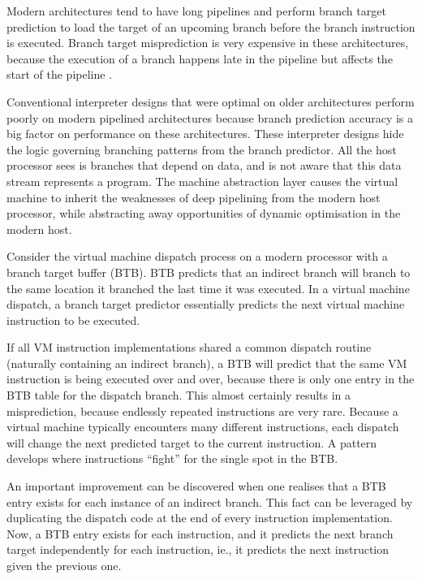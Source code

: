 		Modern architectures tend to have long pipelines and perform branch target prediction to load the target of an upcoming branch before the branch instruction is executed. Branch target misprediction is very expensive in these architectures, because the execution of a branch happens late in the pipeline but affects the start of the pipeline \citep{optimizingindirectbranch}.
				
		Conventional interpreter designs that were optimal on older architectures perform poorly on modern pipelined architectures because branch prediction accuracy is a big factor on performance on these architectures. These interpreter designs hide the logic governing branching patterns from the branch predictor. All the host processor sees is branches that depend on data, and is not aware that this data stream represents a program. The machine abstraction layer causes the virtual machine to inherit the weaknesses of deep pipelining from the modern host processor, while abstracting away opportunities of dynamic optimisation in the modern host.
		
		Consider the virtual machine dispatch process on a modern processor with a branch target buffer (BTB). BTB predicts that an indirect branch will branch to the same location it branched the last time it was executed. In a virtual machine dispatch, a branch target predictor essentially predicts the next virtual machine instruction to be executed.
		
		If all VM instruction implementations shared a common dispatch routine (naturally containing an indirect branch), a BTB will predict that the same VM instruction is being executed over and over, because there is only one entry in the BTB table for the dispatch branch. This almost certainly results in a misprediction, because endlessly repeated instructions are very rare. Because a virtual machine typically encounters many different instructions, each dispatch will change the next predicted target to the current instruction. A pattern develops where instructions ``fight'' for the single spot in the BTB.
		
		An important improvement can be discovered when one realises that a BTB entry exists for each instance of an indirect branch. This fact can be leveraged by duplicating the dispatch code at the end of every instruction implementation. Now, a BTB entry exists for each instruction, and it predicts the next branch target independently for each instruction, ie., it predicts the next instruction given the previous one.
		
